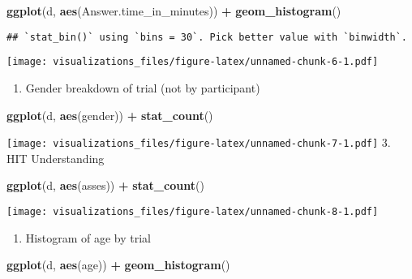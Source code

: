 \documentclass[]{article}
\newenvironment{Shaded}{\begin{snugshade}}{\end{snugshade}}
\newcommand{\KeywordTok}[1]{\textcolor[rgb]{0.13,0.29,0.53}{\textbf{#1}}}
\newcommand{\StringTok}[1]{\textcolor[rgb]{0.31,0.60,0.02}{#1}}
\newcommand{\OperatorTok}[1]{\textcolor[rgb]{0.81,0.36,0.00}{\textbf{#1}}}
\newcommand{\NormalTok}[1]{#1}
\providecommand{\tightlist}{%
  \setlength{\itemsep}{0pt}\setlength{\parskip}{0pt}}
\begin{document}
\begin{Shaded}
\begin{Highlighting}[]
\KeywordTok{ggplot}\NormalTok{(d, }\KeywordTok{aes}\NormalTok{(Answer.time_in_minutes)) }\OperatorTok{+}
\StringTok{   }\KeywordTok{geom_histogram}\NormalTok{()}
\end{Highlighting}
\end{Shaded}

\begin{verbatim}
## `stat_bin()` using `bins = 30`. Pick better value with `binwidth`.
\end{verbatim}

\texttt{[image: visualizations\_files/figure-latex/unnamed-chunk-6-1.pdf]}

\begin{enumerate}
\def\labelenumi{\arabic{enumi}.}
\setcounter{enumi}{1}
\tightlist
\item
  Gender breakdown of trial (not by participant)
\end{enumerate}

\begin{Shaded}
\begin{Highlighting}[]
\KeywordTok{ggplot}\NormalTok{(d, }\KeywordTok{aes}\NormalTok{(gender)) }\OperatorTok{+}
\StringTok{   }\KeywordTok{stat_count}\NormalTok{()}
\end{Highlighting}
\end{Shaded}

\texttt{[image: visualizations\_files/figure-latex/unnamed-chunk-7-1.pdf]}
3. HIT Understanding

\begin{Shaded}
\begin{Highlighting}[]
\KeywordTok{ggplot}\NormalTok{(d, }\KeywordTok{aes}\NormalTok{(asses)) }\OperatorTok{+}
\StringTok{   }\KeywordTok{stat_count}\NormalTok{()}
\end{Highlighting}
\end{Shaded}

\texttt{[image: visualizations\_files/figure-latex/unnamed-chunk-8-1.pdf]}

\begin{enumerate}
\def\labelenumi{\arabic{enumi}.}
\setcounter{enumi}{3}
\tightlist
\item
  Histogram of age by trial
\end{enumerate}

\begin{Shaded}
\begin{Highlighting}[]
\KeywordTok{ggplot}\NormalTok{(d, }\KeywordTok{aes}\NormalTok{(age)) }\OperatorTok{+}
\StringTok{   }\KeywordTok{geom_histogram}\NormalTok{()}
\end{Highlighting}
\end{Shaded}
\end{document}
